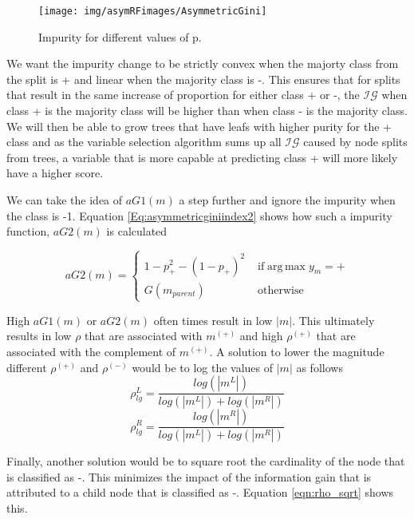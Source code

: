 \begin{figure}
 \centering
\texttt{[image: img/asymRFimages/AsymmetricGini]}\\
 \caption{Impurity for different values of p.}
 \label{Fig:Quantile Regression}
\end{figure}

We want the impurity change to be strictly convex when the majorty class from the split is + and linear when the majority class is -. This ensures that for splits that result in the same increase of proportion for either class + or -, the $\mathcal{IG}$ when class + is the majority class will be higher than when class - is the majority class. We will then be able to grow trees that have leafs with higher purity for the + class and as the variable selection algorithm sums up all $\mathcal{IG}$ caused by node splits from trees, a variable that is more capable at predicting class + will more likely have a higher score. 

We can take the idea of $aG1(m)$ a step further and ignore the impurity when the class is -1. Equation \ref{Eq:asymmetricginiindex2} shows how such a impurity function, $aG2(m)$ is calculated

\begin{equation}\label{Eq:asymmetricginiindex2}
aG2(m)=
\begin{cases} 1-p_{+}^2-(1-p_{+})^2 & \text{ if} \operatorname{arg\,max} y_m = + 
\\ G(m_{parent})&\text{ otherwise}
\end{cases}
\end{equation}

High $aG1(m)$ or $aG2(m)$ often times result in low $|m|$. This ultimately results in low $\rho$ that are associated with $m^{(+)}$ and high $\rho^{(+)}$ that are associated with the complement of $m^{(+)}$. A solution to lower the magnitude different $\rho^{(+)}$  and $\rho^{(-)}$ would be to log the values of $|m|$ as follows
\begin{equation}\label{eqn:rho_log}
	\rho_{lg}^L = \frac{log(|m^L|)}{log(|m^L|)+log(|m^R|)}
\end{equation}
\begin{equation}
	\rho_{lg}^R = \frac{log(|m^R|)}{log(|m^L|)+log(|m^R|)}
\end{equation}


Finally, another solution would be to square root the cardinality of the node that is classified as -. This minimizes the impact of the information gain that is attributed to a child node that is classified as -. Equation \ref{eqn:rho_sqrt} shows this.

